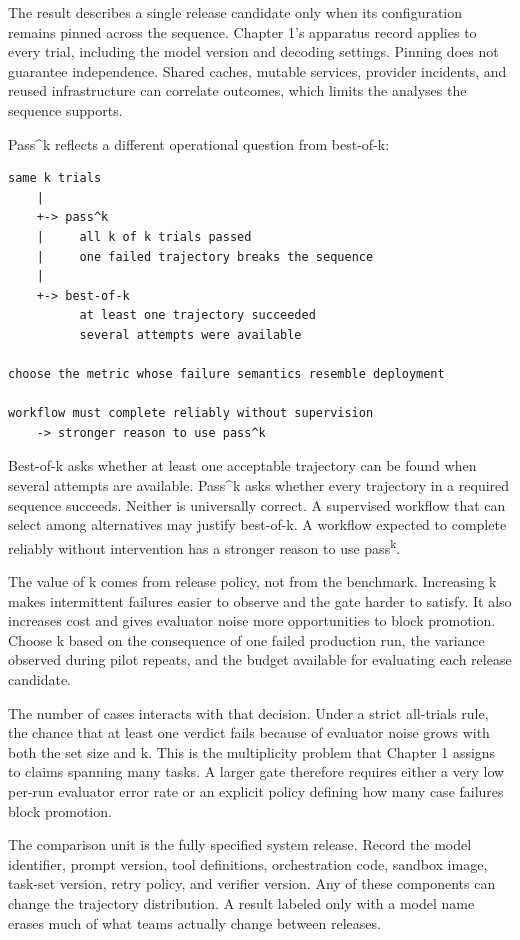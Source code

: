The result describes a single release candidate only when its configuration remains pinned across the sequence. Chapter 1's apparatus record applies to every trial, including the model version and decoding settings. Pinning does not guarantee independence. Shared caches, mutable services, provider incidents, and reused infrastructure can correlate outcomes, which limits the analyses the sequence supports.

Pass\^{}k reflects a different operational question from best-of-k:

\begin{verbatim}
same k trials
    |
    +-> pass^k
    |     all k of k trials passed
    |     one failed trajectory breaks the sequence
    |
    +-> best-of-k
          at least one trajectory succeeded
          several attempts were available

choose the metric whose failure semantics resemble deployment

workflow must complete reliably without supervision
    -> stronger reason to use pass^k
\end{verbatim}

Best-of-k asks whether at least one acceptable trajectory can be found when several attempts are available. Pass\^{}k asks whether every trajectory in a required sequence succeeds. Neither is universally correct. A supervised workflow that can select among alternatives may justify best-of-k. A workflow expected to complete reliably without intervention has a stronger reason to use pass\textsuperscript{k}.

The value of k comes from release policy, not from the benchmark. Increasing k makes intermittent failures easier to observe and the gate harder to satisfy. It also increases cost and gives evaluator noise more opportunities to block promotion. Choose k based on the consequence of one failed production run, the variance observed during pilot repeats, and the budget available for evaluating each release candidate.

The number of cases interacts with that decision. Under a strict all-trials rule, the chance that at least one verdict fails because of evaluator noise grows with both the set size and k. This is the multiplicity problem that Chapter 1 assigns to claims spanning many tasks. A larger gate therefore requires either a very low per-run evaluator error rate or an explicit policy defining how many case failures block promotion.

The comparison unit is the fully specified system release. Record the model identifier, prompt version, tool definitions, orchestration code, sandbox image, task-set version, retry policy, and verifier version. Any of these components can change the trajectory distribution. A result labeled only with a model name erases much of what teams actually change between releases.

